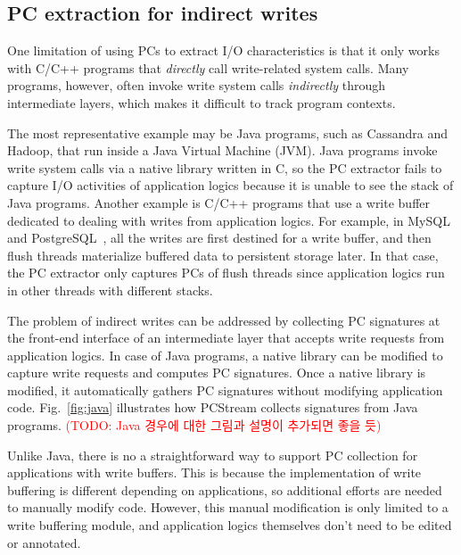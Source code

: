 \subsection{PC extraction for indirect writes}
One limitation of using PCs to extract I/O characteristics is that it only
works with C/C++ programs that \textit{directly} call write-related system
calls.  Many programs, however, often invoke write system calls
\textit{indirectly} through intermediate layers, which makes it difficult to
track program contexts.

The most representative example may be Java programs, such as Cassandra and
Hadoop, that run inside a Java Virtual Machine (JVM). Java programs invoke
write system calls via a native library written in C, so the PC extractor fails
to capture I/O activities of application logics because it is unable to see the
stack of Java programs.  Another example is C/C++ programs that use a write
buffer dedicated to dealing with writes from application logics. For example,
in MySQL~\cite{ref} and PostgreSQL~\cite{ref}, all the writes are first
destined for a write buffer, and then flush threads materialize buffered data
to persistent storage later.  In that case, the PC extractor only captures PCs
of flush threads since application logics run in other threads with different
stacks.

The problem of indirect writes can be addressed by collecting PC signatures at
the front-end interface of an intermediate layer that accepts write requests
from application logics. In case of Java programs, a native library can be
modified to capture write requests and computes PC signatures. Once a native
library is modified, it automatically gathers PC signatures without modifying
application code. Fig.~\ref{fig:java} illustrates how \textsf{PCStream}
collects signatures from Java programs.  \textcolor{red}{(TODO: Java 경우에
대한 그림과 설명이 추가되면 좋을 듯)}

Unlike Java, there is no a straightforward way to support PC collection for
applications with write buffers. This is because the implementation of write
buffering is different depending on applications, so additional efforts are
needed to manually modify code. However, this manual modification is only
limited to a write buffering module, and application logics themselves don't
need to be edited or annotated.




